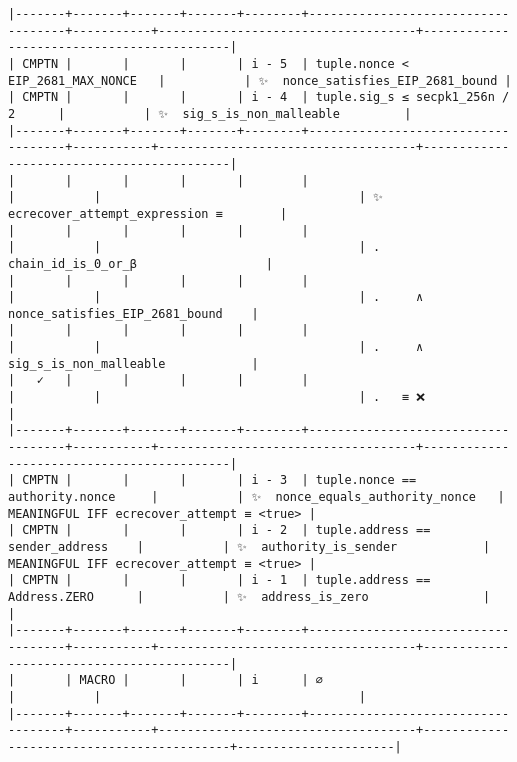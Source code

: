 \documentclass[varwidth=\maxdimen,margin=0.5cm,multi={verbatim}]{standalone}
\begin{document}
\begin{verbatim}
|-------+-------+-------+-------+--------+------------------------------------+-----------+------------------------------------+-------------------------------------------|
| CMPTN |       |       |       | i - 5  | tuple.nonce < EIP_2681_MAX_NONCE   |           | ✨  nonce_satisfies_EIP_2681_bound |
| CMPTN |       |       |       | i - 4  | tuple.sig_s ≤ secpk1_256n / 2      |           | ✨  sig_s_is_non_malleable         |
|-------+-------+-------+-------+--------+------------------------------------+-----------+------------------------------------+-------------------------------------------|
|       |       |       |       |        |                                    |           |                                    | ✨  ecrecover_attempt_expression ≡        |
|       |       |       |       |        |                                    |           |                                    | .     chain_id_is_0_or_β                  |
|       |       |       |       |        |                                    |           |                                    | .     ∧ nonce_satisfies_EIP_2681_bound    |
|       |       |       |       |        |                                    |           |                                    | .     ∧ sig_s_is_non_malleable            |
|   ✓   |       |       |       |        |                                    |           |                                    | .   ≡ ❌                                  |
|-------+-------+-------+-------+--------+------------------------------------+-----------+------------------------------------+-------------------------------------------|
| CMPTN |       |       |       | i - 3  | tuple.nonce == authority.nonce     |           | ✨  nonce_equals_authority_nonce   | MEANINGFUL IFF ecrecover_attempt ≡ <true> |
| CMPTN |       |       |       | i - 2  | tuple.address == sender_address    |           | ✨  authority_is_sender            | MEANINGFUL IFF ecrecover_attempt ≡ <true> |
| CMPTN |       |       |       | i - 1  | tuple.address == Address.ZERO      |           | ✨  address_is_zero                |                                           |
|-------+-------+-------+-------+--------+------------------------------------+-----------+------------------------------------+-------------------------------------------|
|       | MACRO |       |       | i      | ∅                                  |           |                                    |
|-------+-------+-------+-------+--------+------------------------------------+-----------+------------------------------------+-------------------------------------------+----------------------|

\end{verbatim}
\end{document}
